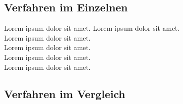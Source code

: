 \subsection{Verfahren im Einzelnen}
Lorem ipsum dolor sit amet.
\pagebreak Lorem ipsum dolor sit amet.\\
\pagebreak Lorem ipsum dolor sit amet.\\
\pagebreak Lorem ipsum dolor sit amet.\\
\pagebreak Lorem ipsum dolor sit amet.\\
\pagebreak Lorem ipsum dolor sit amet.\\
\subsection{Verfahren im Vergleich}